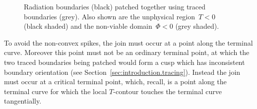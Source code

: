 \begin{figure}
  \newcommand*{\subfigurewidth}{0.36\textwidth}
  \centering
    \hspace*{\fill}
  \begin{subfigure}[t]{\subfigurewidth}
  \end{subfigure}
    \hfill
  \begin{subfigure}[t]{\subfigurewidth}
  \end{subfigure}
    \hspace*{\fill}
  \caption{
    Radiation boundaries (black) patched together
    using traced boundaries (grey).
    Also shown are the unphysical region~$T < 0$ (black shaded)
    and the non-viable domain~$\Phi < 0$ (grey shaded).
  }
  \label{fig:cosine_simple-traced-boundaries-patched}
\end{figure}

\begin{figure}
\end{figure}

To avoid the non-convex spikes,
the join must occur at a point along the terminal curve.
Moreover this point must not be an ordinary terminal point,
at which the two traced boundaries being patched
would form a cusp which has inconsistent boundary orientation
(see Section~\ref{sec:introduction.tracing}).
Instead the join must occur at a critical terminal point,
which, recall, is a point along the terminal curve
for which the local $T$-contour touches the terminal curve tangentially.

